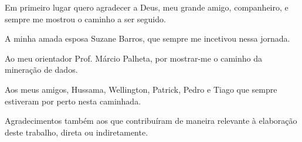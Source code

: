 \documentclass[
	12pt,				%
	openright,			%
	oneside,	
	a4paper,				%
	english,				%
	brazil				%
]{abntex2/abntex2} %
\begin{document}

\begin{agradecimentos}

Em primeiro lugar quero agradecer a Deus, meu grande amigo, companheiro, e sempre me mostrou o caminho a ser seguido.

A minha  amada esposa Suzane Barros, que sempre me incetivou nessa jornada.

Ao meu orientador Prof. Márcio Palheta, por mostrar-me o caminho da mineração de dados.

Aos meus amigos, Hussama, Wellington, Patrick, Pedro e Tiago que sempre estiveram por perto nesta caminhada.

Agradecimentos também aos que contribuíram de maneira relevante à elaboração deste trabalho, direta ou indiretamente.

\end{agradecimentos}






\end{document}
